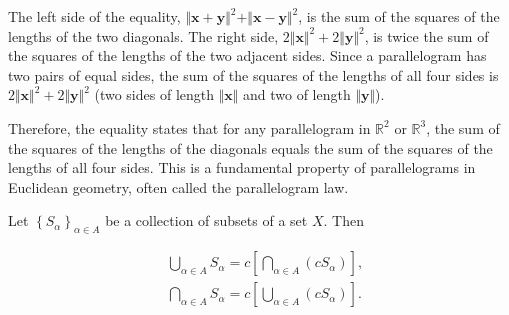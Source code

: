 \documentclass[10pt]{extarticle}
\begin{document}
\begin{solution}
    The left side of the equality, $\Vert\mathbf{x} + \mathbf{y}\Vert^2 + \Vert\mathbf{x} - \mathbf{y}\Vert^2$, is the sum of the squares of the lengths of the two diagonals. The right side, $2\Vert\mathbf{x}\Vert^2 + 2\Vert\mathbf{y}\Vert^2$, is twice the sum of the squares of the lengths of the two adjacent sides. Since a parallelogram has two pairs of equal sides, the sum of the squares of the lengths of all four sides is $2\Vert\mathbf{x}\Vert^2 + 2\Vert\mathbf{y}\Vert^2$ (two sides of length $\Vert\mathbf{x}\Vert$ and two of length $\Vert\mathbf{y}\Vert$).

    Therefore, the equality states that for any parallelogram in $\mathbb{R}^2$ or $\mathbb{R}^3$, the sum of the squares of the lengths of the diagonals equals the sum of the squares of the lengths of all four sides. This is a fundamental property of parallelograms in Euclidean geometry, often called the parallelogram law.
\end{solution}
\begin{lemma}[3.1]
    Let $\left\{S_\alpha\right\}_{\alpha \in A}$ be a collection of subsets of a set $X$. Then

    \begin{equation*}
        \begin{aligned}
             & \bigcup_{\alpha \in A} S_\alpha=c\left[\bigcap_{\alpha \in A}\left(c S_\alpha\right)\right],  \\
             & \bigcap_{\alpha \in A} S_\alpha=c\left[\bigcup_{\alpha \in A}\left(c S_\alpha\right)\right] .
        \end{aligned}
    \end{equation*}

\end{lemma}
\end{document}
